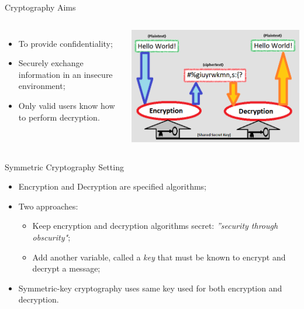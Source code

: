 \documentclass[12pt,table,xcolor={dvipsnames}]{beamer}
\begin{document}
\begin{frame}{Cryptography Aims}
\begin{columns}
\begin{itemize}
\item To provide confidentiality;\pause
\item Securely exchange information in an insecure environment;\pause
\item Only valid users know how to perform decryption.\pause
\end{itemize}
\begin{center}
\includegraphics[scale=.35]{crypto.png}
\end{center}
\end{columns}
\end{frame}


\begin{frame}{Symmetric Cryptography Setting}
\begin{itemize}
\item Encryption and Decryption are specified algorithms;\pause
\item Two approaches:\pause
\begin{itemize}
\item Keep encryption and decryption algorithms secret: \textit{''security through
obscurity"};\pause
\item Add another variable, called a \textit{key} that must be known to encrypt and
decrypt a message;\pause
\end{itemize}
\item Symmetric-key cryptography uses same key used for both encryption and decryption.
\end{itemize}
\end{frame}
\end{document}
